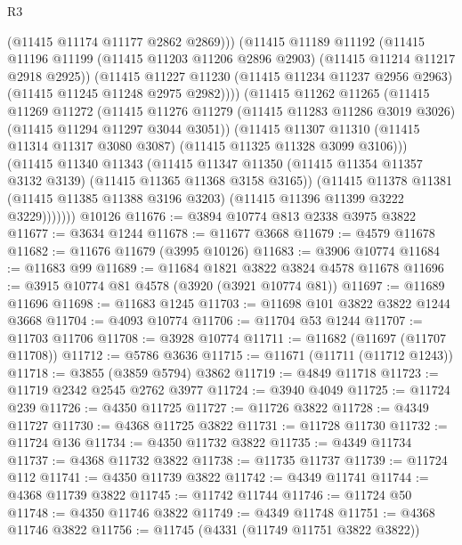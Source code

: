 \begin{lexlean}{R3}
\begin{coremodule}
                (@11415 @11174 @11177 @2862 @2869)))
            (@11415
              @11189
              @11192
              (@11415
                @11196
                @11199
                (@11415 @11203 @11206 @2896 @2903)
                (@11415 @11214 @11217 @2918 @2925))
              (@11415
                @11227
                @11230
                (@11415 @11234 @11237 @2956 @2963)
                (@11415 @11245 @11248 @2975 @2982))))
          (@11415
            @11262
            @11265
            (@11415
              @11269
              @11272
              (@11415
                @11276
                @11279
                (@11415 @11283 @11286 @3019 @3026)
                (@11415 @11294 @11297 @3044 @3051))
              (@11415
                @11307
                @11310
                (@11415 @11314 @11317 @3080 @3087)
                (@11415 @11325 @11328 @3099 @3106)))
            (@11415
              @11340
              @11343
              (@11415
                @11347
                @11350
                (@11415 @11354 @11357 @3132 @3139)
                (@11415 @11365 @11368 @3158 @3165))
              (@11415
                @11378
                @11381
                (@11415 @11385 @11388 @3196 @3203)
                (@11415 @11396 @11399 @3222 @3229)))))))
    @10126
@11676 := @3894 @10774 @813 @2338 @3975 @3822
@11677 := @3634 @1244
@11678 := @11677 @3668
@11679 := @4579 @11678
@11682 := @11676 @11679 (@3995 @10126)
@11683 := @3906 @10774
@11684 := @11683 @99
@11689 := @11684 @1821 @3822 @3824 @4578 @11678
@11696 := @3915 @10774 @81 @4578 (@3920 (@3921 @10774 @81))
@11697 := @11689 @11696
@11698 := @11683 @1245
@11703 := @11698 @101 @3822 @3822 @1244 @3668
@11704 := @4093 @10774
@11706 := @11704 @53 @1244
@11707 := @11703 @11706
@11708 := @3928 @10774
@11711 := @11682 (@11697 (@11707 @11708))
@11712 := @5786 @3636
@11715 := @11671 (@11711 (@11712 @1243))
@11718 := @3855 (@3859 @5794) @3862
@11719 := @4849 @11718
@11723 := @11719 @2342 @2545 @2762 @3977
@11724 := @3940 @4049
@11725 := @11724 @239
@11726 := @4350 @11725
@11727 := @11726 @3822
@11728 := @4349 @11727
@11730 := @4368 @11725 @3822
@11731 := @11728 @11730
@11732 := @11724 @136
@11734 := @4350 @11732 @3822
@11735 := @4349 @11734
@11737 := @4368 @11732 @3822
@11738 := @11735 @11737
@11739 := @11724 @112
@11741 := @4350 @11739 @3822
@11742 := @4349 @11741
@11744 := @4368 @11739 @3822
@11745 := @11742 @11744
@11746 := @11724 @50
@11748 := @4350 @11746 @3822
@11749 := @4349 @11748
@11751 := @4368 @11746 @3822
@11756 := @11745 (@4331 (@11749 @11751 @3822 @3822))

\end{coremodule}
\end{lexlean}
